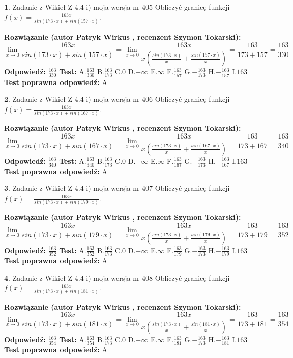 \documentclass[12pt, a4paper]{article}
\theoremstyle{definition} %
\newtheorem{zad}{}
\newcommand{\zadStart}[1]{\begin{zad}#1\newline}
\newcommand{\zadStop}{\end{zad}}
\newcommand{\rozwStart}[2]{\noindent \textbf{Rozwiązanie (autor #1 , recenzent #2): }\newline}
\newcommand{\rozwStop}{\newline}
\newcommand{\odpStart}{\noindent \textbf{Odpowiedź:}\newline}
\newcommand{\odpStop}{\newline}
\newcommand{\testStart}{\noindent \textbf{Test:}\newline}
\newcommand{\testStop}{\newline}
\newcommand{\kluczStart}{\noindent \textbf{Test poprawna odpowiedź:}\newline}
\newcommand{\kluczStop}{\newline}
\begin{document}
\zadStart{Zadanie z Wikieł Z 4.4 i) moja wersja nr 405}
Obliczyć granicę funkcji $f(x)=\frac{163x}{sin(173\cdot x) +sin(157\cdot x)}$.
\zadStop
\rozwStart{Patryk Wirkus}{Szymon Tokarski}
$$\lim\limits_{x\to 0}\frac{163x}{sin(173\cdot x) +sin(157\cdot x)}=\lim\limits_{x\to 0}\frac{163x}{x(\frac{sin(173\cdot x)}{x}+\frac{sin(157\cdot x)}{x})}=\frac{163}{173+157} = \frac{163}{330}$$
\rozwStop
\odpStart
$\frac{163}{330}$
\odpStop
\testStart
A.$\frac{163}{330}$
B.$\frac{163}{173}$
C.$0$
D.$-\infty$
E.$\infty$
F.$\frac{163}{157}$
G.$-\frac{163}{173}$
H.$-\frac{163}{157}$
I.$163$
\testStop
\kluczStart
A
\kluczStop



\zadStart{Zadanie z Wikieł Z 4.4 i) moja wersja nr 406}
Obliczyć granicę funkcji $f(x)=\frac{163x}{sin(173\cdot x) +sin(167\cdot x)}$.
\zadStop
\rozwStart{Patryk Wirkus}{Szymon Tokarski}
$$\lim\limits_{x\to 0}\frac{163x}{sin(173\cdot x) +sin(167\cdot x)}=\lim\limits_{x\to 0}\frac{163x}{x(\frac{sin(173\cdot x)}{x}+\frac{sin(167\cdot x)}{x})}=\frac{163}{173+167} = \frac{163}{340}$$
\rozwStop
\odpStart
$\frac{163}{340}$
\odpStop
\testStart
A.$\frac{163}{340}$
B.$\frac{163}{173}$
C.$0$
D.$-\infty$
E.$\infty$
F.$\frac{163}{167}$
G.$-\frac{163}{173}$
H.$-\frac{163}{167}$
I.$163$
\testStop
\kluczStart
A
\kluczStop



\zadStart{Zadanie z Wikieł Z 4.4 i) moja wersja nr 407}
Obliczyć granicę funkcji $f(x)=\frac{163x}{sin(173\cdot x) +sin(179\cdot x)}$.
\zadStop
\rozwStart{Patryk Wirkus}{Szymon Tokarski}
$$\lim\limits_{x\to 0}\frac{163x}{sin(173\cdot x) +sin(179\cdot x)}=\lim\limits_{x\to 0}\frac{163x}{x(\frac{sin(173\cdot x)}{x}+\frac{sin(179\cdot x)}{x})}=\frac{163}{173+179} = \frac{163}{352}$$
\rozwStop
\odpStart
$\frac{163}{352}$
\odpStop
\testStart
A.$\frac{163}{352}$
B.$\frac{163}{173}$
C.$0$
D.$-\infty$
E.$\infty$
F.$\frac{163}{179}$
G.$-\frac{163}{173}$
H.$-\frac{163}{179}$
I.$163$
\testStop
\kluczStart
A
\kluczStop



\zadStart{Zadanie z Wikieł Z 4.4 i) moja wersja nr 408}
Obliczyć granicę funkcji $f(x)=\frac{163x}{sin(173\cdot x) +sin(181\cdot x)}$.
\zadStop
\rozwStart{Patryk Wirkus}{Szymon Tokarski}
$$\lim\limits_{x\to 0}\frac{163x}{sin(173\cdot x) +sin(181\cdot x)}=\lim\limits_{x\to 0}\frac{163x}{x(\frac{sin(173\cdot x)}{x}+\frac{sin(181\cdot x)}{x})}=\frac{163}{173+181} = \frac{163}{354}$$
\rozwStop
\odpStart
$\frac{163}{354}$
\odpStop
\testStart
A.$\frac{163}{354}$
B.$\frac{163}{173}$
C.$0$
D.$-\infty$
E.$\infty$
F.$\frac{163}{181}$
G.$-\frac{163}{173}$
H.$-\frac{163}{181}$
I.$163$
\testStop
\kluczStart
A
\kluczStop
\end{document}
